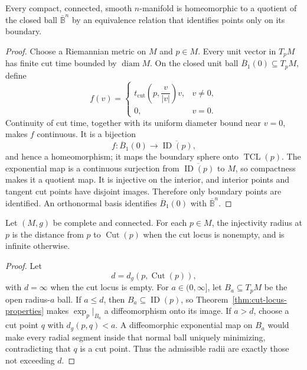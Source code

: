 \begin{corollary}
\label{cor:compact-manifold-quotient}
Every compact, connected, smooth $n$-manifold is homeomorphic to a quotient of
the closed ball $\overline{\mathbb B}^n$ by an equivalence relation that
identifies points only on its boundary.

\begin{proof}
\sketch Choose a Riemannian metric on $M$ and $p\in M$. Every unit vector in
$T_pM$ has finite cut time bounded by $\operatorname{diam}M$. On the closed
unit ball $\overline B_1(0)\subseteq T_pM$, define
\[
f(v)=
\begin{cases}
t_{\mathrm{cut}}\left(p,\dfrac v{|v|}\right)v,&v\ne0,\\[2mm]
0,&v=0.
\end{cases}
\]
Continuity of cut time, together with its uniform diameter bound near $v=0$,
makes $f$ continuous. It is a bijection
\[
f\colon\overline B_1(0)\longrightarrow
\overline{\operatorname{ID}(p)},
\]
and hence a homeomorphism; it maps the boundary sphere onto
$\operatorname{TCL}(p)$. The exponential map is a continuous surjection from
$\overline{\operatorname{ID}(p)}$ to $M$, so compactness makes it a quotient
map. It is injective on the interior, and interior points and tangent cut points
have disjoint images. Therefore only boundary points are identified. An
orthonormal basis identifies $\overline B_1(0)$ with
$\overline{\mathbb B}^n$.
\end{proof}
\end{corollary}

\begin{proposition}
\label{prop:injectivity-radius-cut-locus}
Let $(M,g)$ be complete and connected. For each $p\in M$, the injectivity
radius at $p$ is the distance from $p$ to $\operatorname{Cut}(p)$ when the cut
locus is nonempty, and is infinite otherwise.

\begin{proof}
\sketch Let
\[
d=d_g(p,\operatorname{Cut}(p)),
\]
with $d=\infty$ when the cut locus is empty. For
$a\in(0,\infty]$, let $B_a\subseteq T_pM$ be the open radius-$a$ ball. If
$a\leq d$, then $B_a\subseteq\operatorname{ID}(p)$, so
Theorem~\ref{thm:cut-locus-properties} makes $\exp_p|_{B_a}$ a diffeomorphism
onto its image. If $a>d$, choose a cut point $q$ with $d_g(p,q)<a$. A
diffeomorphic exponential map on $B_a$ would make every radial segment inside
that normal ball uniquely minimizing, contradicting that $q$ is a cut point.
Thus the admissible radii are exactly those not exceeding $d$.
\end{proof}
\end{proposition}

